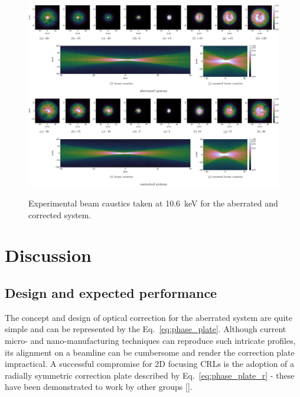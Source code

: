 \begin{refsection}
\begin{figure}[t]
        \centering
        {\includegraphics[width=1.0\linewidth]{figures/ch06/experimental_CDn_pp.pdf}}
        \caption[Experimental beam caustics for the aberrated and corrected systems]{Experimental beam caustics taken at 10.6~keV for the aberrated and corrected system.}\label{fig:experimental_CDn_pp}
\end{figure}
\section{Discussion}\label{sec:corrective_optics_discussion}

\subsection{Design and expected performance}

The concept and design of optical correction for the aberrated system are quite simple and can be represented by the Eq.~\ref{eq:phase_plate}. Although current micro- and nano-manufacturing techniques can reproduce such intricate profiles, its alignment on a beamline can be cumbersome and render the correction plate impractical. A successful compromise for 2D focusing CRLs is the adoption of a radially symmetric correction plate described by Eq.~\ref{eq:phase_plate_r} - these have been demonstrated to work by other groups [\cite{Seiboth2017,Seiboth2018,Seiboth2020,Dhamgaye2020}]. 


\end{refsection}
